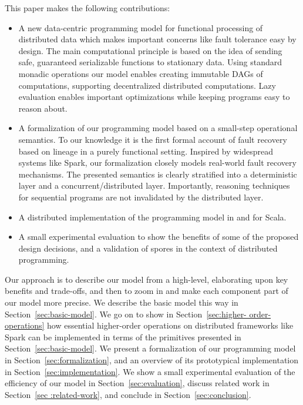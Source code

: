 \documentclass[preprint]{sigplanconf}
\theoremstyle{definition}
\theoremstyle{definition}
\begin{document}
This paper makes the following contributions:
\begin{itemize} %

\item A new data-centric programming model for functional processing of
distributed data which makes important concerns like fault tolerance easy by
design. The main computational principle is based on the idea of sending safe,
guaranteed serializable functions to stationary data. Using standard monadic
operations our model enables creating immutable DAGs of computations,
supporting decentralized distributed computations. Lazy evaluation enables
important optimizations while keeping programs easy to reason about.

\item A formalization of our programming model based on a small-step
operational  semantics. To our knowledge it is the first formal account of
fault recovery based on lineage in a purely functional setting. Inspired by
widespread systems like Spark, our formalization closely models real-world
fault recovery mechanisms. The presented semantics is clearly stratified into
a deterministic layer and a concurrent/distributed layer. Importantly,
reasoning techniques for sequential programs are not invalidated by the
distributed layer.

\item A distributed implementation of the programming model in and for Scala.

\item A small experimental evaluation to show the benefits of some of  the
proposed design decisions, and a validation of spores in the context of
distributed programming.


\end{itemize}


Our approach is to describe our model from a high-level, elaborating upon key
benefits and trade-offs, and then to zoom in and make each component part of
our model more precise. We describe the basic model this way in
Section~\ref{sec:basic-model}. We go on to show in Section~\ref{sec:higher-
order-operations} how essential higher-order operations on distributed
frameworks like Spark can be implemented in terms of the primitives presented
in Section~\ref{sec:basic-model}. We present a formalization of our
programming model in Section~\ref{sec:formalization}, and an overview of its
prototypical implementation in Section~\ref{sec:implementation}. We show a
small experimental evaluation of the efficiency of our model in
Section~\ref{sec:evaluation}, discuss related work in Section~\ref{sec
:related-work}, and conclude in Section~\ref{sec:conclusion}.
\end{document}
